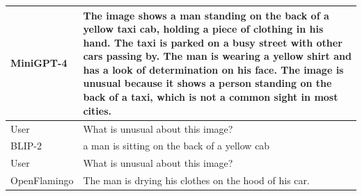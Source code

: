 \documentclass{article}
\begin{document}
\begin{table}
\begin{minipage}{0.99\textwidth}
{\begin{tabular}{l p{12.5cm} }
MiniGPT-4 & The image shows a man standing on the back of a yellow taxi cab, holding a piece of clothing in his hand. The taxi is parked on a busy street with other cars passing by. The man is wearing a yellow shirt and has a look of determination on his face. The image is unusual because it shows a person standing on the back of a taxi, which is not a common sight in most cities.
\\ \midrule
User & What is unusual about this image? \\
BLIP-2 & a man is sitting on the back of a yellow cab
\\ \midrule
User & What is unusual about this image? \\
OpenFlamingo & The man is drying his clothes on the hood of his car.
\\
\bottomrule
\end{tabular}
}
\vspace{1mm}
\vspace{-7mm}
\label{tab:visual_example_ironing}  
  \end{minipage}
\end{table}
\end{document}

